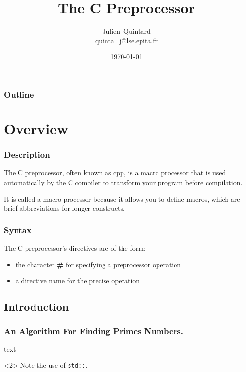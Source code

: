 \documentclass{beamer}
\title{The C Preprocessor}
\author
{
  Julien~Quintard\inst{1} \\
  {\tiny quinta\_j@lse.epita.fr}
}
\institute
{
  \inst{1} EPITA Computer System Laboratory
}
\date{\today}
\begin{document}
%
%

\begin{frame}
  \titlepage
\end{frame}

%
%

\begin{frame}
  \frametitle{Outline}
  \tableofcontents
\end{frame}

%
%

\section{Overview}

%
%

\begin{frame}
  \frametitle{Description}

  The C preprocessor, often known as cpp, is a macro processor that
  is used automatically by the C compiler to transform your program
  before compilation.


  It is called a macro processor because it allows you to define macros,
  which are brief abbreviations for longer constructs.
\end{frame}

%
%

\begin{frame}[fragile]
  \frametitle{Syntax}

  The C preprocessor's directives are of the form:

  \begin{itemize}
    \item
      the character \textbf{\#} for specifying a preprocessor operation
    \item
      a directive name for the precise operation
  \end{itemize}

\end{frame}

\subsection{Introduction}

\begin{frame}[fragile]
  \frametitle{An Algorithm For Finding Primes Numbers.}

  \begin{semiverbatim}
    text
  \end{semiverbatim}

  \begin{uncoverenv}<2>
    Note the use of \verb|std::|.
  \end{uncoverenv}

\end{frame}
\end{document}
